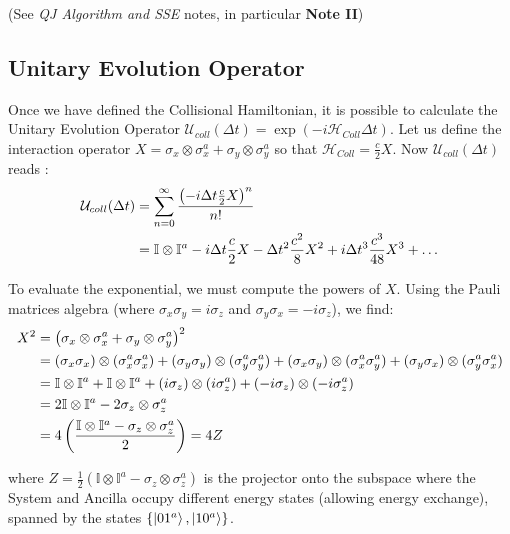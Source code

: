 \documentclass[a4paper,12pt]{article}
\begin{document}
(See \textit{QJ Algorithm and SSE} notes, in particular \textbf{Note II})

\subsection{Unitary Evolution Operator}
\label{sub:Unitary_Evolution_Operator}

Once we have defined the Collisional Hamiltonian, it is possible to calculate the Unitary Evolution Operator $ \mathcal{U}_{coll}(\Delta t) = \exp \left( -i \mathcal{H}_{Coll} \Delta t \right) $. 
Let us define the interaction operator \newline
$ X = \sigma_{x} \otimes \sigma_{x}^{a} + \sigma_{y} \otimes \sigma_{y}^{a} $ so that $ \mathcal{H}_{Coll} = \frac{c}{2} X $. Now $ \mathcal{U}_{coll}(\Delta t)  $ reads : 
\begin{align}
	\mathcal{U}_{coll}(\Delta t) &=  \sum_{n=0}^{\infty}{\frac{\left( -i \Delta t \frac{c}{2} X \right)^n}{n!} } \notag \\
	&= \mathbb{I} \otimes \mathbb{I}^{a} - i \Delta t \frac{c}{2}  X - \Delta t^{2} \frac{c^{2}}{8} X^{2}  + i \Delta t^{3} \frac{c^{3}}{48} X^{3} + \dots
\end{align}

To evaluate the exponential, we must compute the powers of $ X $. Using the Pauli matrices algebra (where $ \sigma_x \sigma_y = i\sigma_z $ and $ \sigma_y \sigma_x = -i\sigma_z $), we find:
\begin{align}
	X^{2} &= \left( \sigma_{x} \otimes \sigma_{x}^{a} + \sigma_{y} \otimes \sigma_{y}^{a} \right)^{2} \notag \\
	&= (\sigma_{x} \sigma_{x}) \otimes (\sigma_{x}^{a} \sigma_{x}^{a}) + (\sigma_{y} \sigma_{y}) \otimes (\sigma_{y}^{a} \sigma_{y}^{a}) + (\sigma_{x} \sigma_{y}) \otimes (\sigma_{x}^{a} \sigma_{y}^{a}) + (\sigma_{y} \sigma_{x}) \otimes (\sigma_{y}^{a} \sigma_{x}^{a}) \notag \\
	&= \mathbb{I} \otimes \mathbb{I}^{a} + \mathbb{I} \otimes \mathbb{I}^{a} + (i\sigma_{z}) \otimes (i\sigma_{z}^{a}) + (-i\sigma_{z}) \otimes (-i\sigma_{z}^{a}) \notag \\
	&= 2 \mathbb{I} \otimes \mathbb{I}^{a} - 2 \sigma_{z} \otimes \sigma_{z}^{a} \notag \\
	&= 4 \left( \frac{\mathbb{I} \otimes \mathbb{I}^{a} - \sigma_{z} \otimes \sigma_{z}^{a}}{2} \right) = 4 Z
	\label{eq:pauli_matrix_prop_PE}
\end{align}

where $ Z = \frac{1}{2} (\mathbb{I} \otimes \mathbb{I}^{a} - \sigma_{z} \otimes \sigma_{z}^{a}) $ is the projector onto the subspace where the System and Ancilla occupy different energy states (allowing energy exchange), spanned by the states $ \{ \ket{01^{a}} , \ket{10^{a}}\} $. 
\end{document}
